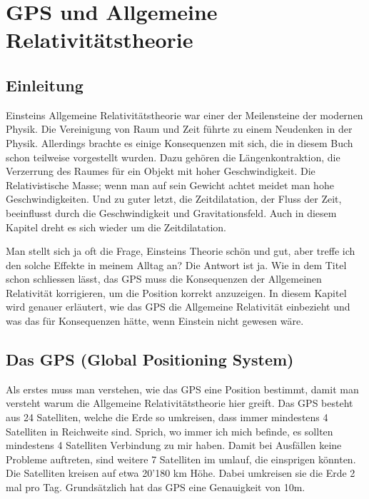 
\chapter{GPS und Allgemeine Relativitätstheorie\label{chapter:thema}}
\begin{refsection}

\section{Einleitung}
Einsteins Allgemeine Relativitätstheorie war einer der Meilensteine der modernen Physik. Die Vereinigung von Raum und Zeit führte zu einem Neudenken in der Physik. Allerdings brachte es einige Konsequenzen mit sich, die in diesem Buch schon teilweise vorgestellt wurden. Dazu gehören die Längenkontraktion, die Verzerrung des Raumes für ein Objekt mit hoher Geschwindigkeit. Die Relativistische Masse; wenn man auf sein Gewicht achtet meidet man hohe Geschwindigkeiten. Und zu guter letzt, die Zeitdilatation, der Fluss der Zeit, beeinflusst durch die Geschwindigkeit und Gravitationsfeld. Auch in diesem Kapitel dreht es sich wieder um die Zeitdilatation.

Man stellt sich ja oft die Frage, Einsteins Theorie schön und gut, aber treffe ich den solche Effekte in meinem Alltag an? Die Antwort ist ja. Wie in dem Titel schon schliessen lässt, das GPS muss die Konsequenzen der Allgemeinen Relativität korrigieren, um die Position korrekt anzuzeigen. In diesem Kapitel wird genauer erläutert, wie das GPS die Allgemeine Relativität einbezieht und was das für Konsequenzen hätte, wenn Einstein nicht gewesen wäre.

\section{Das GPS (Global Positioning System)}
Als erstes muss man verstehen, wie das GPS eine Position bestimmt, damit man versteht warum die Allgemeine Relativitätstheorie hier greift. Das GPS besteht aus 24 Satelliten, welche die Erde so umkreisen, dass immer mindestens 4 Satelliten in Reichweite sind. Sprich, wo immer ich mich befinde, es sollten mindestens 4 Satelliten Verbindung zu mir haben. Damit bei Ausfällen keine Probleme auftreten, sind weitere 7 Satelliten im umlauf, die einsprigen könnten. Die Satelliten kreisen auf etwa 20'180 km Höhe. Dabei umkreisen sie die Erde 2 mal pro Tag. Grundsätzlich hat das GPS eine Genauigkeit von 10m. 


\end{refsection}
